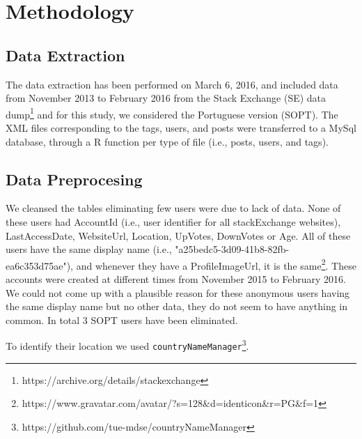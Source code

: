 \section{Methodology}
\subsection{Data Extraction}
\noindent The data extraction has been performed on March 6, 2016, and included data from November 2013 to February 2016 from the Stack Exchange (SE) data dump\footnote{https://archive.org/details/stackexchange} and for this study, we considered the Portuguese version (SOPT). The XML files corresponding to the tags, users, and posts were transferred to a MySql database, through a R function per type of file (i.e., posts, users, and tags). 
\subsection{Data Preprocesing}
We cleansed the tables eliminating few users were due to lack of data. None of these users had AccountId (i.e., user identifier for all stackExchange websites), LastAccessDate, WebsiteUrl, Location, UpVotes, DownVotes or Age. All of these users have the same display name (i.e., "a25bedc5-3d09-41b8-82fb-ea6c353d75ae"), and whenever they have a ProfileImageUrl, it is the same\footnote{https://www.gravatar.com/avatar/?s=128\&d=identicon\&r=PG\&f=1}. These accounts were created at different times from November 2015 to February 2016. We could not come up with a plausible reason for these anonymous users having the same display name but no other data, they do not seem to have anything in common. In total 3 SOPT users have been eliminated. 

To identify their location we used \texttt{countryNameManager}\footnote{https://github.com/tue-mdse/countryNameManager}.

